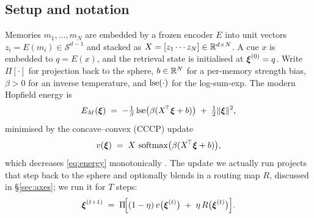 \label{sec:method}

\subsection{Setup and notation}

Memories $m_1,\dots,m_N$ are embedded by a frozen encoder $E$ into unit vectors
$z_i = E(m_i) \in \mathcal{S}^{d-1}$ and stacked as $X = [z_1 \cdots z_N] \in \mathbb{R}^{d\times N}$.
A cue $x$ is embedded to $q = E(x)$, and the retrieval state is initialised at
$\boldsymbol{\xi}^{(0)} = q$. Write $\Pi[\cdot]$ for projection back to the sphere, $b \in \mathbb{R}^N$ for a
per-memory strength bias, $\beta>0$ for an inverse temperature, and $\operatorname{lse}(\cdot)$ for the
log-sum-exp. The modern Hopfield energy \citep{ramsauer2021hopfield} is
\begin{equation}
E_M(\boldsymbol{\xi}) \;=\; -\tfrac{1}{\beta}\operatorname{lse}\!\big(\beta(X^{\!\top}\boldsymbol{\xi} + b)\big) \;+\; \tfrac12\|\boldsymbol{\xi}\|^2,
\label{eq:energy}
\end{equation}
minimised by the concave--convex (CCCP) update
\begin{equation}
v(\boldsymbol{\xi}) \;=\; X\,\operatorname{softmax}\!\big(\beta(X^{\!\top}\boldsymbol{\xi} + b)\big),
\label{eq:cccp}
\end{equation}
which decreases \eqref{eq:energy} monotonically \citep{ramsauer2021hopfield}. The update we
actually run projects that step back to the sphere and optionally blends in a routing map
$R$, discussed in \S\ref{sec:axes}; we run it for $T$ steps:
\begin{equation}
\boldsymbol{\xi}^{(t+1)} \;=\; \Pi\!\Big[(1-\eta)\,v\big(\boldsymbol{\xi}^{(t)}\big) \;+\; \eta\, R\big(\boldsymbol{\xi}^{(t)}\big)\Big].
\label{eq:update}
\end{equation}

